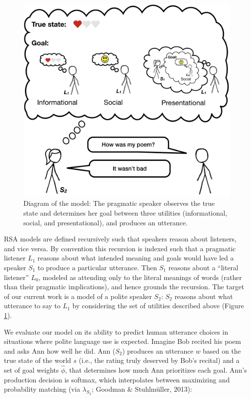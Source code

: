 \documentclass[floatsintext,mask,man]{apa6}
\theoremstyle{definition}
\theoremstyle{definition}
\theoremstyle{definition}
\theoremstyle{remark}
\begin{document}
\begin{figure}[!h]
\includegraphics[width=\textwidth]{fig/model} \caption{Diagram of the model: The pragmatic speaker observes the true state and determines her goal between three utilities (informational, social, and presentational), and produces an utterance.}\label{fig:model}
\end{figure}

RSA models are defined recursively such that speakers reason about
listeners, and vice versa. By convention this recursion is indexed such
that a pragmatic listener \(L_1\) reasons about what intended meaning
and goals would have led a speaker \(S_1\) to produce a particular
utterance. Then \(S_1\) reasons about a \enquote{literal listener}
\(L_0\), modeled as attending only to the literal meanings of words
(rather than their pragmatic implications), and hence grounds the
recursion. The target of our current work is a model of a polite speaker
\(S_2\): \(S_2\) reasons about what utterance to say to \(L_1\) by
considering the set of utilities described above (Figure
\ref{fig:model}).

We evaluate our model on its ability to predict human utterance choices
in situations where polite language use is expected. Imagine Bob recited
his poem and asks Ann how well he did. Ann (\(S_2\)) produces an
utterance \(w\) based on the true state of the world \(s\) (i.e., the
rating truly deserved by Bob's recital) and a set of goal weights
\(\hat{\phi}\), that determines how much Ann prioritizes each goal.
Ann's production decision is softmax, which interpolates between
maximizing and probability matching (via \(\lambda_{S_2}\); Goodman \&
Stuhlmüller, 2013):
\end{document}
